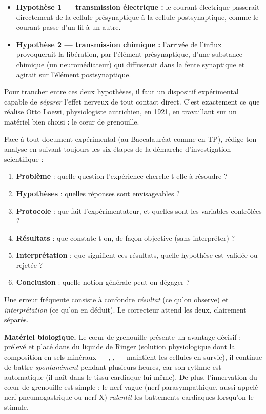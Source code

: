 \documentclass[11pt]{article}
\newcommand{\cle}[1]{{\popxbold\color{popdark}#1}}
\newcounter{popsec}
\newcounter{popsub}
\newcommand{\courssub}[1]{%
  \stepcounter{popsub}%
  \par\vspace{9pt}\noindent{\popxbold\fontsize{11.5}{13}\selectfont\color{popink}{\color{poporange}\thepopsec.\thepopsub}\hspace{6pt}#1}\par\nopagebreak\vspace{4pt}
}
\begin{document}
\begin{itemize}
\item \textbf{Hypothèse 1 — transmission électrique :} le courant électrique passerait directement de la cellule présynaptique à la cellule postsynaptique, comme le courant passe d'un fil à un autre.
\item \textbf{Hypothèse 2 — transmission chimique :} l'arrivée de l'influx provoquerait la libération, par l'élément présynaptique, d'une \cle{substance chimique} (un \cle{neuromédiateur}) qui diffuserait dans la fente synaptique et agirait sur l'élément postsynaptique.
\end{itemize}

Pour trancher entre ces deux hypothèses, il faut un dispositif expérimental capable de \emph{séparer} l'effet nerveux de tout contact direct. C'est exactement ce que réalise Otto Loewi, physiologiste autrichien, en 1921, en travaillant sur un matériel bien choisi : le \cle{cœur de grenouille}.

\begin{methode}
Face à tout document expérimental (au Baccalauréat comme en TP), rédige ton analyse en suivant toujours les six étapes de la démarche d'investigation scientifique :
\begin{enumerate}
\item \textbf{Problème} : quelle question l'expérience cherche-t-elle à résoudre ?
\item \textbf{Hypothèses} : quelles réponses sont envisageables ?
\item \textbf{Protocole} : que fait l'expérimentateur, et quelles sont les variables contrôlées ?
\item \textbf{Résultats} : que constate-t-on, de façon objective (sans interpréter) ?
\item \textbf{Interprétation} : que signifient ces résultats, quelle hypothèse est validée ou rejetée ?
\item \textbf{Conclusion} : quelle notion générale peut-on dégager ?
\end{enumerate}
Une erreur fréquente consiste à confondre \emph{résultat} (ce qu'on observe) et \emph{interprétation} (ce qu'on en déduit). Le correcteur attend les deux, clairement séparés.
\end{methode}

\courssub{Le dispositif expérimental de Loewi (1921)}

\textbf{Matériel biologique.} Le cœur de grenouille présente un avantage décisif : prélevé et placé dans du \cle{liquide de Ringer} (solution physiologique dont la composition en sels minéraux — , ,  — maintient les cellules en survie), il continue de battre \emph{spontanément} pendant plusieurs heures, car son rythme est automatique (il naît dans le tissu cardiaque lui-même). De plus, l'innervation du cœur de grenouille est simple : le \cle{nerf vague} (nerf parasympathique, aussi appelé nerf pneumogastrique ou nerf X) \emph{ralentit} les battements cardiaques lorsqu'on le stimule.
\end{document}
